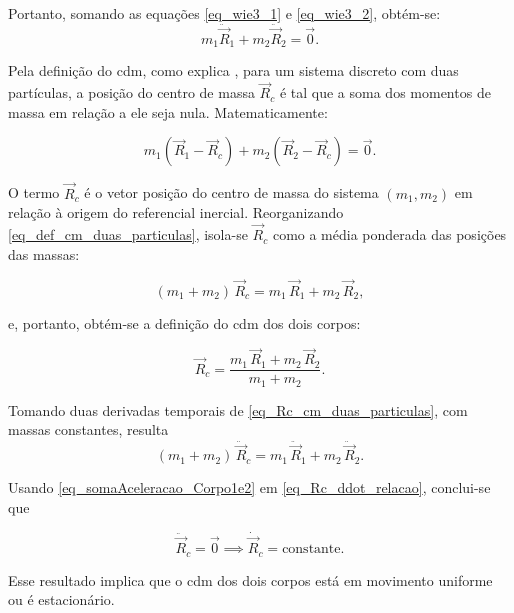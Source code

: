 Portanto, somando as equações \eqref{eq_wie3_1} e \eqref{eq_wie3_2}, obtém-se:
\begin{equation}
\label{eq_somaAceleracao_Corpo1e2}
m_1 \ddot{\vec R}_1 + m_2 \ddot{\vec R}_2 = \vec 0.
\end{equation}

Pela definição do \gls{cdm}, como explica \cite{halliday_resnick_walker_fundamentos1}, para um sistema discreto com duas partículas, a posição do centro de massa $\vec{R}_c$ é tal que a soma dos momentos de massa em relação a ele seja nula. Matematicamente:

\begin{equation}
m_1\left(\vec R_1-\vec R_{c}\right)+m_2\left(\vec R_2-\vec R_{c}\right)=\vec 0.
\label{eq_def_cm_duas_particulas}
\end{equation}

O termo $\vec{R}_c$ é o vetor posição do centro de massa do sistema $(m_1, m_2)$ em relação à origem do referencial inercial.
Reorganizando \eqref{eq_def_cm_duas_particulas}, isola-se $\vec{R}_c$ como a média ponderada das posições das massas:

\begin{equation}
(m_1+m_2)\,\vec R_{c} = m_1\,\vec R_1 + m_2\,\vec R_2,
\end{equation}

e, portanto, obtém-se a definição do \gls{cdm} dos dois corpos:

\begin{equation}
\vec R_{c} = \frac{m_1\,\vec R_1 + m_2\,\vec R_2}{m_1+m_2}.
\label{eq_Rc_cm_duas_particulas}
\end{equation}

Tomando duas derivadas temporais de \eqref{eq_Rc_cm_duas_particulas}, com massas constantes, resulta
\begin{equation}
(m_1+m_2)\,\ddot{\vec R}_{c} = m_1\,\ddot{\vec R}_1 + m_2\,\ddot{\vec R}_2.
\label{eq_Rc_ddot_relacao}
\end{equation}

Usando \eqref{eq_somaAceleracao_Corpo1e2} em \eqref{eq_Rc_ddot_relacao}, conclui-se que

\begin{equation}
\label{eq_Rc_vec0}
\ddot{\vec R}_{c} = \vec 0 \implies \dot{\vec{R}}_{c} = \text{constante}.
\end{equation}

Esse resultado implica que o \gls{cdm} dos dois corpos está em movimento uniforme ou é estacionário.

